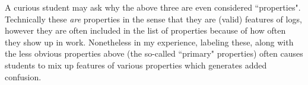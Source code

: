 \documentclass{ximera}
\begin{document}
    A curious student may ask why the above three are even considered ``properties". Technically these \textit{are} properties in the sense that they are (valid) features of logs, however they are often included in the list of properties because of how often they show up in work. Nonetheless in my experience, labeling these, along with the less obvious properties above (the so-called ``primary" properties) often causes students to mix up features of various properties which generates added confusion.
%
%
%
%
\end{document}
